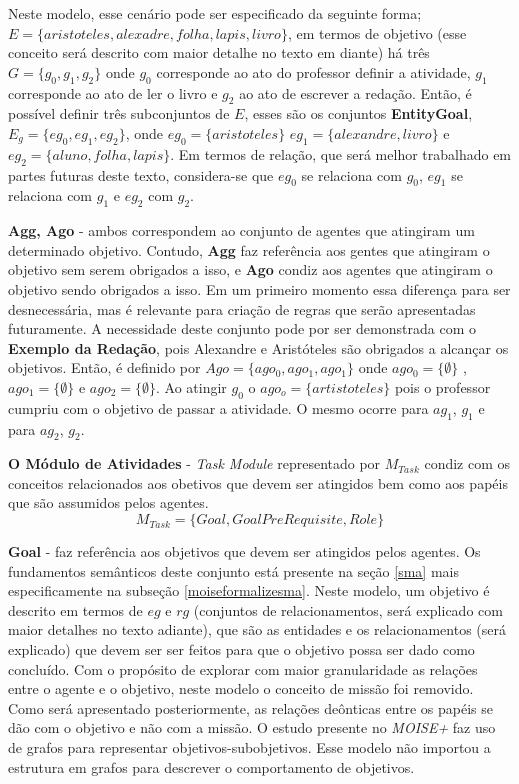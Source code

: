Neste modelo, esse cenário pode ser especificado da seguinte forma; $E = \{aristoteles, alexadre, folha, lapis, livro\}$, em termos de objetivo (esse conceito será descrito com maior detalhe no texto em diante) há três $G = \{ g_0, g_1,g_2\}$  onde $g_0$ corresponde ao ato do professor definir a atividade, $g_1$ corresponde ao ato de ler o livro e $g_2$ ao ato de escrever a redação. Então, é possível 
definir três subconjuntos de $E$, esses são os conjuntos \textbf{EntityGoal}, $E_g = \{ eg_{0}, eg_{1}, eg_{2} \}$, onde $eg_{0} = \{ aristoteles \}$ $eg_{1} = \{ alexandre, livro\}$ e $eg_{2} = \{ aluno, folha, lapis \}$. Em termos de relação, que será melhor trabalhado 
em partes futuras deste texto, considera-se que $eg_0$ se relaciona com $g_0$, $eg_1$ se relaciona com $g_1$ e $eg_2$ com $g_2$.

\textbf{Agg, Ago} - ambos correspondem ao conjunto de agentes que atingiram um determinado objetivo. Contudo, \textbf{Agg} faz referência aos gentes que atingiram o objetivo sem serem obrigados a isso, e \textbf{Ago} condiz aos agentes que atingiram o objetivo sendo obrigados a isso. Em um primeiro momento essa diferença para ser desnecessária, mas é relevante para criação de regras que serão apresentadas futuramente. A necessidade deste conjunto pode por ser demonstrada com o \textbf{Exemplo da Redação}, pois Alexandre e Aristóteles são obrigados a alcançar os objetivos. Então, é definido por $Ago = \{ ago_0, ago_1, ago_1 \}$ onde $ago_0 = \{ \emptyset \}$ , $ago_1 = \{ \emptyset \}$ e $ago_2 = \{ \emptyset \}$. Ao atingir $g_0$ o $ago_o = \{ artistoteles\}$ pois o professor cumpriu com o objetivo de passar a atividade. O mesmo ocorre para $ag_1$, $g_1$ e para $ag_2$, $g_2$.


\textbf{O Módulo de Atividades} - \textit{Task Module} representado por $M_{Task}$ condiz com os conceitos relacionados aos obetivos que devem ser atingidos bem como aos papéis que são assumidos pelos agentes.
\begin{equation}
    M_{Task} = \{ Goal, GoalPreRequisite, Role \}
\end{equation}

\textbf{Goal} - faz referência aos objetivos que devem ser atingidos pelos agentes. Os fundamentos semânticos deste conjunto está presente na seção \ref{sma} mais especificamente na subseção \ref{moiseformalizesma}. Neste modelo, um objetivo é descrito em termos de $eg$ e $rg$ (conjuntos de relacionamentos, será explicado com maior detalhes no texto adiante), que são as entidades e os relacionamentos (será explicado) que devem ser ser feitos para que o objetivo possa ser dado como concluído. Com o propósito de explorar com maior granularidade as relações entre o agente e o objetivo, neste modelo o conceito de missão foi removido. Como será apresentado posteriormente, as relações deônticas entre os papéis se dão com o objetivo e não com a missão. O estudo presente no \textit{MOISE+} faz uso de grafos para representar objetivos-subobjetivos. Esse modelo não importou a estrutura em grafos para descrever o comportamento de objetivos. 

